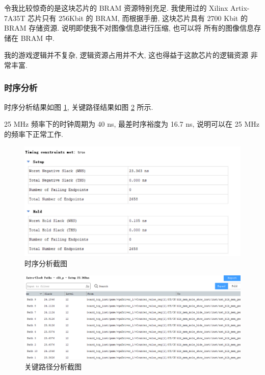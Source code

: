 令我比较惊奇的是这块芯片的 BRAM 资源特别充足. 我使用过的
Xilinx Artix-7A35T 芯片只有 256Kbit 的 BRAM, 而根据手册, 这块芯片具有
2700 Kbit 的 BRAM 存储资源. 说明即使我不对图像信息进行压缩, 也可以将
所有的图像信息存储在 BRAM 中.

我的游戏逻辑并不复杂, 逻辑资源占用并不大, 这也得益于这款芯片的逻辑资源
非常丰富.

\subsubsection{时序分析}

时序分析结果如图 \ref{fig:timing}, 关键路径结果如图 \ref{fig:criticalpath} 所示.

25 MHz 频率下的时钟周期为 40 ns, 最差时序裕度为 16.7 ns, 说明可以在 25 MHz 的频率下正常工作.

\begin{figure}[htbp]
  \centering
  \includegraphics[width=\textwidth]{res/img/timing.png}
  \caption{时序分析截图}
  \label{fig:timing}
\end{figure}

\begin{figure}[htbp]
  \centering
  \includegraphics[width=\textwidth]{res/img/criticalpath.png}
  \caption{关键路径分析截图}
  \label{fig:criticalpath}
\end{figure}

